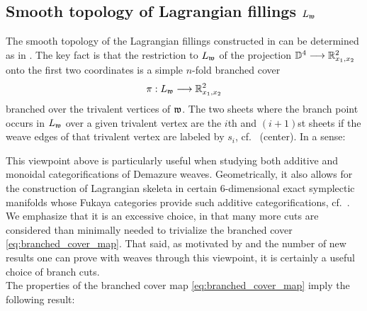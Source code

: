 \subsection{Smooth topology of Lagrangian fillings $L_{\mathfrak{w}}$}\label{ssec:smooth_topology_Lagrangian_filling_from_weave} The smooth topology of the Lagrangian fillings constructed in  can be determined as in . The key fact is that the restriction to $L_{\mathfrak{w}}$ of the projection $\mathbb{D}^4\longrightarrow\mathbb{R}^2_{x_1,x_2}$ onto the first two coordinates is a simple $n$-fold branched cover
\begin{equation}\label{eq:branched_cover_map}
\pi:L_{\mathfrak{w}}\longrightarrow\mathbb{R}^2_{x_1,x_2}
\end{equation}
\noindent branched over the trivalent vertices of $\mathfrak{w}$. The two sheets where the branch point occurs in $L_{\mathfrak{w}}$ over a given trivalent vertex are the $i$th and $(i+1)$st sheets if the weave edges of that trivalent vertex are labeled by $s_i$, cf.~ (center). In a sense:
\begin{center}
\end{center}
\vspace{0.2cm}
\noindent This viewpoint above is particularly useful when studying both additive and monoidal categorifications of Demazure weaves. Geometrically, it also allows for the construction of Lagrangian skeleta in certain 6-dimensional exact symplectic manifolds whose Fukaya categories provide such additive categorifications, cf.~\cite{CasalsChrist}. We emphasize that it is an excessive choice, in that many more cuts are considered than minimally needed to trivialize the branched cover \eqref{eq:branched_cover_map}. That said, as motivated by  and the number of new results one can prove with weaves through this viewpoint, it is certainly a useful choice of branch cuts.\\

The properties of the branched cover map \eqref{eq:branched_cover_map} imply the following result:


